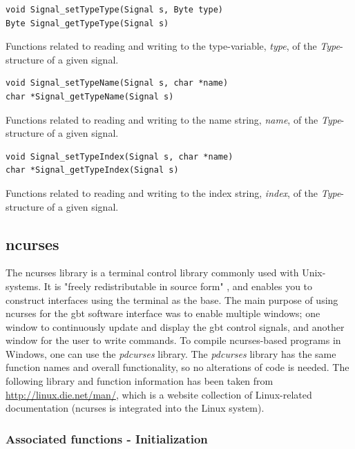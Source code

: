\documentclass[main.tex]{subfiles}
\begin{document}
\begin{lstlisting}[frame=single] 
void Signal_setTypeType(Signal s, Byte type)
Byte Signal_getTypeType(Signal s)
\end{lstlisting}

Functions related to reading and writing to the type-variable, \textit{type}, of the \textit{Type}-structure of a given signal.\\

\begin{lstlisting}[frame=single] 
void Signal_setTypeName(Signal s, char *name)
char *Signal_getTypeName(Signal s)
\end{lstlisting}

Functions related to reading and writing to the name string, \textit{name}, of the \textit{Type}-structure of a given signal.\\

\begin{lstlisting}[frame=single] 
void Signal_setTypeIndex(Signal s, char *name)
char *Signal_getTypeIndex(Signal s)
\end{lstlisting}

Functions related to reading and writing to the index string, \textit{index}, of the \textit{Type}-structure of a given signal.

\subsection{ncurses} \label{sec:ncurses}

The ncurses library is a terminal control library commonly used with Unix-systems. It is "freely redistributable in source form" \cite{ncursesdoc}, and enables you to construct interfaces using the terminal as the base. The main purpose of using ncurses for the \gls{gbt} software interface was to enable multiple windows; one window to continuously update and display the \gls{gbt} control signals, and another window for the user to write commands. To compile ncurses-based programs in Windows, one can use the \textit{pdcurses} library. The \textit{pdcurses} library has the same function names and overall functionality, so no alterations of code is needed. The following library and function information has been taken from \url{http://linux.die.net/man/}, which is a website collection of Linux-related documentation (ncurses is integrated into the Linux system). 

\subsubsection{Associated functions - Initialization}
\end{document}
